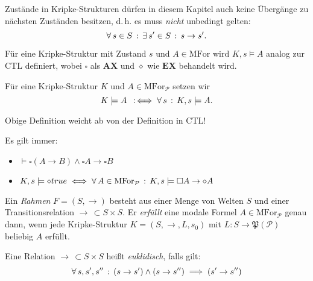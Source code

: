 \documentclass{cheat-sheet}
\newcommand{\lra}{\leftrightarrow}
\newcommand{\MFor}{\mathrm{MFor}} %
\newcommand{\AX}{\mathbf{AX}}
\newcommand{\EX}{\mathbf{EX}}
\begin{document}
\begin{defn}
  Zustände in Kripke-Strukturen dürfen in diesem Kapitel auch keine Übergänge zu nächsten Zuständen besitzen, d.\,h. es muss \textit{nicht} unbedingt gelten:
  \[ \forall \, {s \in S} \,:\, \exists \, {s' \in S} \,:\, s \to s'.\]
\end{defn}

\begin{defn}
  Für eine Kripke-Struktur mit Zustand $s$ und $A \in \MFor$ wird $K, s \models A$ analog zur CTL definiert, wobei $\square$ als $\AX$ und $\diamond$ wie $\EX$ behandelt wird.
\end{defn}

\begin{defn}
  Für eine Kripke-Struktur $K$ und $A \in \MFor_{\mathcal{P}}$ setzen wir
  \[ K \models A \enspace:\!\iff \forall \, {s} \,:\, K, s \models A. \]
\end{defn}

\begin{acht}
  Obige Definition weicht ab von der Definition in CTL!
\end{acht}

\begin{bem}
  Es gilt immer: \enspace \begin{minipage}{0.5\linewidth}\begin{itemize}\item $\models \square (A \to B) \wedge \square A \to \square B$\end{itemize}\end{minipage}
  \begin{itemize}
    \miniitem{0.44 \linewidth}{$\models \square (A \wedge B) \lra (\square A \wedge \square B)$}
    \miniitem{0.44 \linewidth}{$\models \diamond (A \vee B) \lra (\diamond A \vee \diamond B)$}
    \item $K, s \models \diamond true \iff \fa{A \in \MFor_{\mathcal{P}}} K, s \models \square A \to \diamond A$
  \end{itemize}
\end{bem}

\begin{defn}
  Ein \emph{Rahmen} $F = (S, \to)$ besteht aus einer Menge von Welten $S$ und einer Transitionsrelation $\to \, \subset S \times S$. Er \emph{erfüllt} eine modale Formel $A \in \MFor_{\mathcal{P}}$ genau dann, wenn jede Kripke-Struktur $K = (S, \to, L, s_0)$ mit $L : S \to \mathfrak{P}(\mathcal{P})$ beliebig $A$ erfüllt.
\end{defn}

\begin{defn}
  Eine Relation $\to \, \subset S \times S$ heißt \emph{euklidisch}, falls gilt:
  \[ \forall \, {s, s', s''} \,:\, (s \to s') \wedge (s \to s'') \implies (s' \to s'') \]
\end{defn}
\end{document}
